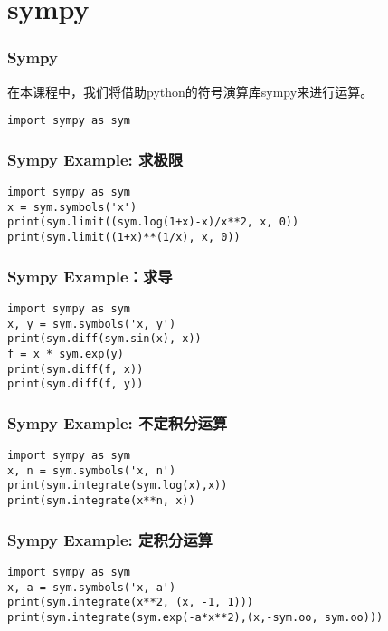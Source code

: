 \documentclass[CJK,13pt]{beamer}
\date{}
\begin{document}
  \bch
{}


\section{sympy}


\begin{frame}[fragile]
  \frametitle{Sympy}
  在本课程中，我们将借助python的符号演算库sympy来进行运算。

\bcode{}  
\begin{verbatim}
import sympy as sym
\end{verbatim}
\ecode

\skipline

\end{frame}


\begin{frame}[fragile]
  \frametitle{Sympy Example: 求极限}
\begin{verbatim}
import sympy as sym
x = sym.symbols('x')
print(sym.limit((sym.log(1+x)-x)/x**2, x, 0))
print(sym.limit((1+x)**(1/x), x, 0))
\end{verbatim}
\ecode
\end{frame}

\begin{frame}[fragile]
  \frametitle{Sympy Example：求导}
\begin{verbatim}
import sympy as sym
x, y = sym.symbols('x, y')
print(sym.diff(sym.sin(x), x))
f = x * sym.exp(y)
print(sym.diff(f, x))
print(sym.diff(f, y))
\end{verbatim}
\ecode
\end{frame}


\begin{frame}[fragile]
  \frametitle{Sympy Example: 不定积分运算}
\begin{verbatim}
import sympy as sym
x, n = sym.symbols('x, n')
print(sym.integrate(sym.log(x),x))
print(sym.integrate(x**n, x))
\end{verbatim}
\ecode
\end{frame}

\begin{frame}[fragile]
  \frametitle{Sympy Example: 定积分运算}
\begin{verbatim}
import sympy as sym
x, a = sym.symbols('x, a')
print(sym.integrate(x**2, (x, -1, 1)))
print(sym.integrate(sym.exp(-a*x**2),(x,-sym.oo, sym.oo)))
\end{verbatim}
\ecode
\end{frame}
\end{document}

